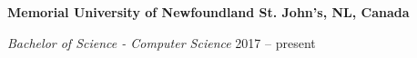 \textbf{Memorial University of Newfoundland \hfill St. John's, NL, Canada} \par
\textit{Bachelor of Science - Computer Science} \hfill 2017 -- present\par